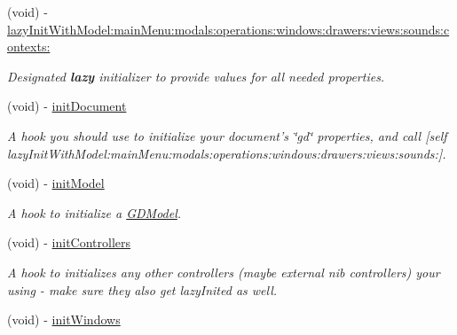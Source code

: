 \begin{DoxyCompactItemize}
\item 
(void) -\/ \hyperlink{interface_g_d_document_a5d6d2016ec8205c51c122f0ac5de4797}{lazyInitWithModel:mainMenu:modals:operations:windows:drawers:views:sounds:contexts:}
\begin{DoxyCompactList}\small\item\em Designated {\bfseries lazy} initializer to provide values for all needed properties. \item\end{DoxyCompactList}\item 
(void) -\/ \hyperlink{interface_g_d_document_a182ddb59c8db972db052825787e80154}{initDocument}
\begin{DoxyCompactList}\small\item\em A hook you should use to initialize your document's \char`\"{}gd\char`\"{} properties, and call \mbox{[}self lazyInitWithModel:mainMenu:modals:operations:windows:drawers:views:sounds:\mbox{]}. \item\end{DoxyCompactList}\item 
(void) -\/ \hyperlink{interface_g_d_document_a5f93ebfe18cb29f4d3c6664c62b67130}{initModel}
\begin{DoxyCompactList}\small\item\em A hook to initialize a \hyperlink{interface_g_d_model}{GDModel}. \item\end{DoxyCompactList}\item 
\hypertarget{interface_g_d_document_aee6d7635212964c335f87bf27e6d1e0f}{
(void) -\/ \hyperlink{interface_g_d_document_aee6d7635212964c335f87bf27e6d1e0f}{initControllers}}
\label{interface_g_d_document_aee6d7635212964c335f87bf27e6d1e0f}

\begin{DoxyCompactList}\small\item\em A hook to initializes any other controllers (maybe external nib controllers) your using -\/ make sure they also get lazyInited as well. \item\end{DoxyCompactList}\item 
\hypertarget{interface_g_d_document_a623ac446f735c0d310fd6c2220c4f598}{
(void) -\/ \hyperlink{interface_g_d_document_a623ac446f735c0d310fd6c2220c4f598}{initWindows}}
\label{interface_g_d_document_a623ac446f735c0d310fd6c2220c4f598}


\end{DoxyCompactItemize}
